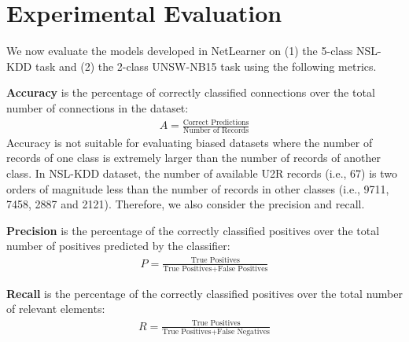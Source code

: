 \section{Experimental Evaluation}

We now evaluate the models developed in NetLearner on (1) the 5-class NSL-KDD task and (2) the 2-class UNSW-NB15 task using the following metrics.

\textbf{Accuracy} is the percentage of correctly classified connections
    over the total number of connections in the dataset:
    \begin{align}
        A = \frac{\text{Correct Predictions}}{\text{Number of Records}}
    \end{align} 
    Accuracy is not suitable for evaluating biased datasets where the number
    of records of one class is extremely larger than the number of
    records of another class.
    In NSL-KDD dataset, the number of available U2R records (i.e., 67)
    is two orders of magnitude less than the number of records in other classes
    (i.e., 9711, 7458, 2887 and 2121).
    Therefore, we also consider the precision and recall.

\textbf{Precision} is the percentage of the correctly classified positives over
    the total number of positives predicted by the classifier:
            \begin{align}
                P = \frac{\text{True Positives}}{\text{True Positives} + \text{False Positives}}
            \end{align}

\textbf{Recall} is the percentage of the correctly classified positives over
    the total number of relevant elements:
            \begin{align}
                R = \frac{\text{True Positives}}{\text{True Positives} + \text{False Negatives}}
            \end{align}

